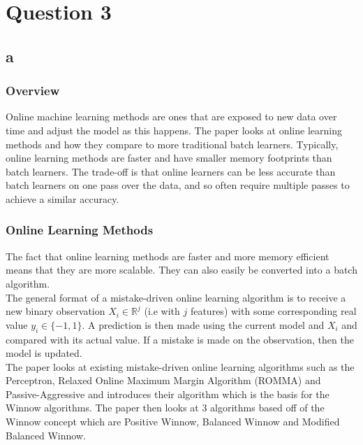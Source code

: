 \documentclass{article}
\begin{document}
\newpage
\section*{Question 3}

\subsection*{a}

\subsubsection*{Overview}

Online machine learning methods are ones that are exposed to new data over time and adjust the model as this happens.
The paper looks at online learning methods and how they compare to more traditional batch learners. Typically, online
learning methods are faster and have smaller memory footprints than batch learners. The trade-off is that online
learners can be less accurate than batch learners on one pass over the data, and so often require multiple passes to achieve a similar 
accuracy.\\

\subsubsection*{Online Learning Methods}

The fact that online learning methods are faster and more memory efficient means that they are more scalable. They can also
easily be converted into a batch algorithm.\\

The general format of a mistake-driven online learning algorithm is to receive a new binary observation \(X_{i} \in \mathbb{R}^{j}\) (i.e with \(j\) features) 
with some corresponding real value \(y_{i} \in \{-1,1\}\). A prediction is then made using the current model and \(X_{i}\) and compared with its actual 
value. If a mistake is made on the observation, then the model is updated.\\

The paper looks at existing mistake-driven online learning algorithms such as the Perceptron, Relaxed Online Maximum Margin Algorithm 
(ROMMA) and Passive-Aggressive and introduces their algorithm which is the basis for the Winnow algorithms. The paper then looks at 3 
algorithms based off of the Winnow concept which are Positive Winnow, Balanced Winnow and Modified Balanced Winnow.\\
\end{document}
